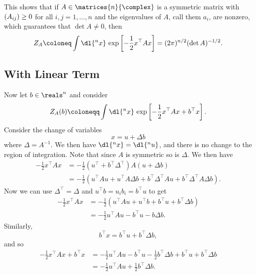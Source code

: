 \documentclass[fleqn]{NotesClass}
\let\Re\relax
\DeclareMathOperator{\Re}{Re}
\newcommand{\trans}{{\top}}
\begin{document}
    This shows that if \(A \in \matrices{n}{\complex}\) is a symmetric matrix with \(\Re(A_{ij}) \ge 0\) for all \(i, j = 1, \dotsc, n\) and the eigenvalues of \(A\), call them \(a_i\), are nonzero, which guarantees that \(\det A \ne 0\), then
    \begin{equation}
        Z_A \coloneq \int \dl{^nx} \, \exp\left[ -\frac{1}{2}x^\trans Ax \right] = (2\pi)^{n/2} (\det A)^{-1/2}.
    \end{equation}
    
    \subsection{With Linear Term}
    Now let \(b \in \reals^n\) and consider
    \begin{equation}
        Z_A(b) \coloneqq \int \dl{^nx} \, \exp\left[ -\frac{1}{2} x^\trans Ax + b^\trans x \right].
    \end{equation}
    Consider the change of variables
    \begin{equation}
        x = u + \Delta b
    \end{equation}
    where \(\Delta = A^{-1}\).
    We then have \(\dl{^nx} = \dl{^nu}\), and there is no change to the region of integration.
    Note that since \(A\) is symmetric so is \(\Delta\).
    We then have
    \begin{align}
        -\frac{1}{2}x^\trans A x &= -\frac{1}{2}(u^\trans + b^\trans \Delta^\trans) A (u + \Delta b)\\
        &= -\frac{1}{2}(u^\trans A u + u^\trans A\Delta b + b^\trans \Delta^\trans A u + b^\trans \Delta^\trans A \Delta b).
    \end{align}
    Now we can use \(\Delta^\trans = \Delta\) and \(u^\trans b = u_ib_i = b^\trans u\) to get
    \begin{align}
        -\frac{1}{2} x^\trans A x &= -\frac{1}{2}(u^\trans A u + u^\trans b + b^\trans u + b^\trans \Delta b)\\
        &= -\frac{1}{2}u^\trans A u - b^\trans u - b \Delta b.
    \end{align}
    Similarly,
    \begin{equation}
        b^\trans x = b^\trans u + b^\trans \Delta b,
    \end{equation}
    and so
    \begin{align}
        -\frac{1}{2}x^\trans A x + b^\trans x &= -\frac{1}{2}u^\trans A u - b^\trans u - \frac{1}{2} b^\trans \Delta b + b^\trans u + b^\trans \Delta b\\
        &=  -\frac{1}{2} u^\trans A u + \frac{1}{2} b^\trans \Delta b.
    \end{align}
\end{document}

